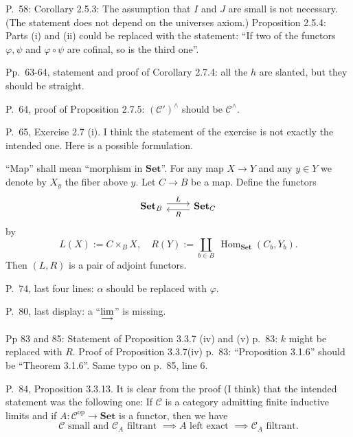 \documentclass[12pt]{article}
\theoremstyle{remark}
\theoremstyle{definition}
\newcommand{\C}{\mathcal C}
\newcommand{\Set}{\mathbf{Set}}
\newcommand{\colim}{\operatornamewithlimits{\underset{\longrightarrow}{lim}}}
\DeclareMathOperator{\Hom}{Hom}%
\DeclareMathOperator{\op}{op}
\begin{document}

\noindent P.~58: Corollary 2.5.3: The assumption that $I$ and $J$ are small is not necessary. (The statement does not depend on the universes axiom.) Proposition 2.5.4: Parts (i) and (ii) could be replaced with the statement: ``If two of the functors $\varphi,\psi$ and $\varphi\circ\psi$ are cofinal, so is the third one''.

\noindent Pp.~63-64, statement and proof of Corollary 2.7.4: all the $h$ are slanted, but they should be straight.

\noindent P.~64, proof of Proposition 2.7.5: $(\C')^\wedge$ should be $\C^\wedge$. 

\noindent P.~65, Exercise 2.7 (i). I think the statement of the exercise is not exactly the intended one. Here is a possible formulation. 

``Map'' shall mean ``morphism in $\Set$''. For any map $X\to Y$ and any $y\in Y$ we denote by $X_y$ the fiber above $y$. Let $C\to B$ be a map. Define the functors 
$$
\begin{tikzcd}
\Set_B\ar[yshift=.7ex]{r}{L}&\Set_C\ar[yshift=-.7ex]{l}{R}
\end{tikzcd}
$$ 
by 
$$
L(X):=C\times_BX,\quad R(Y):=\coprod_{b\in B}\ \Hom_{\Set}(C_b,Y_b). 
$$ 
Then $(L,R)$ is a pair of adjoint functors. 

\noindent P.~74, last four lines: $\alpha$ should be replaced with $\varphi$. 

\noindent P.~80, last display: a ``$\displaystyle\colim$'' is missing.

\noindent Pp 83 and 85: Statement of Proposition 3.3.7 (iv) and (v) p.~83: $k$ might be replaced with $R$. %
Proof of Proposition 3.3.7(iv) p.~83: ``Proposition 3.1.6'' should be ``Theorem 3.1.6''. Same typo on p.~85, line 6. 

\noindent P.~84, Proposition 3.3.13. It is clear from the proof (I think) that the intended statement was the following one: If $\C$ is a category admitting finite inductive limits and if $A:\C^{\op}\to\Set$ is a functor, then we have 
$$
\C\text{ small and }\C_A\text{ filtrant }\implies A\text{ left exact }\implies\C_A\text{ filtrant}.
$$
\end{document}
